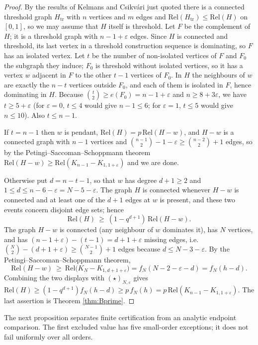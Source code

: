 \documentclass[
  11pt,
]{article}
\theoremstyle{definition}
\theoremstyle{remark}
\begin{document}
\begin{proof}
By the results of Kelmans and Csikvári just quoted there is a connected threshold graph $H_{\mathrm{tr}}$ with $n$ vertices and $m$ edges and $\mathrm{Rel}(H_{\mathrm{tr}})\le\mathrm{Rel}(H)$ on $[0,1]$, so we may assume that $H$ itself is threshold. Let $F$ be the complement of $H$; it is a threshold graph with $n-1+\varepsilon$ edges. Since $H$ is connected and threshold, its last vertex in a threshold construction sequence is dominating, so $F$ has an isolated vertex. Let $t$ be the number of non-isolated vertices of $F$ and $F_0$ the subgraph they induce; $F_0$ is threshold without isolated vertices, so it has a vertex $w$ adjacent in $F$ to the other $t-1$ vertices of $F_0$. In $H$ the neighbours of $w$ are exactly the $n-t$ vertices outside $F_0$, and each of them is isolated in $F$, hence dominating in $H$. Because $\binom t2\ge e(F_0)=n-1+\varepsilon$ and $n\ge8+3\varepsilon$, we have $t\ge5+\varepsilon$ (for $\varepsilon=0$, $t\le4$ would give $n-1\le6$; for $\varepsilon=1$, $t\le5$ would give $n\le10$). Also $t\le n-1$.

If $t=n-1$ then $w$ is pendant, $\mathrm{Rel}(H)=p\,\mathrm{Rel}(H-w)$, and $H-w$ is a connected graph with $n-1$ vertices and $\binom{n-1}2-1-\varepsilon\ge\binom{n-2}2+1$ edges, so by the Petingi–Saccoman–Schoppmann theorem $\mathrm{Rel}(H-w)\ge\mathrm{Rel}(K_{n-1}-K_{1,1+\varepsilon})$ and we are done.

Otherwise put $d=n-t-1$, so that $w$ has degree $d+1\ge2$ and $1\le d\le n-6-\varepsilon=N-5-\varepsilon$. The graph $H$ is connected whenever $H-w$ is connected and at least one of the $d+1$ edges at $w$ is present, and these two events concern disjoint edge sets; hence
$$\mathrm{Rel}(H)\ \ge\ (1-q^{d+1})\,\mathrm{Rel}(H-w).$$
The graph $H-w$ is connected (any neighbour of $w$ dominates it), has $N$ vertices, and has $(n-1+\varepsilon)-(t-1)=d+1+\varepsilon$ missing edges, i.e. $\binom N2-(d+1+\varepsilon)\ge\binom{N-1}2+1$ edges because $d\le N-3-\varepsilon$. By the Petingi–Saccoman–Schoppmann theorem,
$$\mathrm{Rel}(H-w)\ \ge\ \mathrm{Rel}\bigl(K_N-K_{1,d+1+\varepsilon}\bigr)=f_N(N-2-\varepsilon-d)=f_N(h-d).$$
Combining the two displays with $(\star)_{N,\varepsilon}$ gives $\mathrm{Rel}(H)\ge(1-q^{d+1})f_N(h-d)\ge p\,f_N(h)=p\,\mathrm{Rel}(K_{n-1}-K_{1,1+\varepsilon})$. The last assertion is Theorem \ref{thm:Bprime}.
\end{proof}

The next proposition separates finite certification from an analytic
endpoint comparison. The first excluded value has five small-order
exceptions; it does not fail uniformly over all orders.
\end{document}
